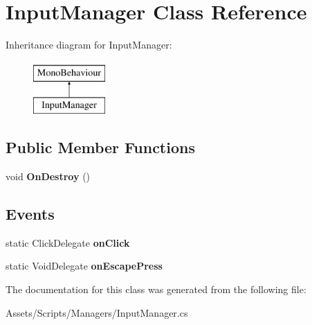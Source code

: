\hypertarget{class_input_manager}{}\section{Input\+Manager Class Reference}
\label{class_input_manager}
Inheritance diagram for Input\+Manager\+:\begin{figure}[H]
\begin{center}
\leavevmode
\includegraphics[height=2.000000cm]{class_input_manager}
\end{center}
\end{figure}
\subsection*{Public Member Functions}
\begin{DoxyCompactItemize}
\item 
void {\bfseries On\+Destroy} ()\hypertarget{class_input_manager_ae45098c58b84ad9d805c20cceee492d0}{}\label{class_input_manager_ae45098c58b84ad9d805c20cceee492d0}

\end{DoxyCompactItemize}
\subsection*{Events}
\begin{DoxyCompactItemize}
\item 
static Click\+Delegate {\bfseries on\+Click}\hypertarget{class_input_manager_a1cc95536c19ed45ce645e20aca69755e}{}\label{class_input_manager_a1cc95536c19ed45ce645e20aca69755e}

\item 
static Void\+Delegate {\bfseries on\+Escape\+Press}\hypertarget{class_input_manager_a81a585645cea9e8936c148e0b653df36}{}\label{class_input_manager_a81a585645cea9e8936c148e0b653df36}

\end{DoxyCompactItemize}


The documentation for this class was generated from the following file\+:\begin{DoxyCompactItemize}
\item 
Assets/\+Scripts/\+Managers/Input\+Manager.\+cs\end{DoxyCompactItemize}
